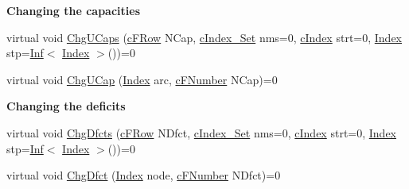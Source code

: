 \begin{Indent}\textbf{ Changing the capacities}\par
\begin{DoxyCompactItemize}
\item 
virtual void \mbox{\hyperlink{class_m_c_f_class_ad548db90d9914f8a40bbb4823f274ccc}{Chg\+U\+Caps}} (\mbox{\hyperlink{class_m_c_f_class_ad325f3193dbba0ddef1da4e72d29eda6}{c\+F\+Row}} N\+Cap, \mbox{\hyperlink{class_m_c_f_class_a81575b2d4e4d5636b17170432150ae69}{c\+Index\+\_\+\+Set}} nms=0, \mbox{\hyperlink{class_m_c_f_class_a76aaabb20535c51a2752b93f6c38fe54}{c\+Index}} strt=0, \mbox{\hyperlink{class_m_c_f_class_ad53d6229d7ec28555a9c9c2fd9abf773}{Index}} stp=\mbox{\hyperlink{class_o_p_ttypes__di__unipi__it_1_1_inf}{Inf}}$<$ \mbox{\hyperlink{class_m_c_f_class_ad53d6229d7ec28555a9c9c2fd9abf773}{Index}} $>$())=0
\item 
virtual void \mbox{\hyperlink{class_m_c_f_class_a832883594b6ea5a00fabc9f4be41d9e5}{Chg\+U\+Cap}} (\mbox{\hyperlink{class_m_c_f_class_ad53d6229d7ec28555a9c9c2fd9abf773}{Index}} arc, \mbox{\hyperlink{class_m_c_f_class_a11f747fbdff346237c8db4469d569994}{c\+F\+Number}} N\+Cap)=0
\end{DoxyCompactItemize}
\end{Indent}
\begin{Indent}\textbf{ Changing the deficits}\par
\begin{DoxyCompactItemize}
\item 
virtual void \mbox{\hyperlink{class_m_c_f_class_a50ee5aaf0f8b39a1edec078828ade458}{Chg\+Dfcts}} (\mbox{\hyperlink{class_m_c_f_class_ad325f3193dbba0ddef1da4e72d29eda6}{c\+F\+Row}} N\+Dfct, \mbox{\hyperlink{class_m_c_f_class_a81575b2d4e4d5636b17170432150ae69}{c\+Index\+\_\+\+Set}} nms=0, \mbox{\hyperlink{class_m_c_f_class_a76aaabb20535c51a2752b93f6c38fe54}{c\+Index}} strt=0, \mbox{\hyperlink{class_m_c_f_class_ad53d6229d7ec28555a9c9c2fd9abf773}{Index}} stp=\mbox{\hyperlink{class_o_p_ttypes__di__unipi__it_1_1_inf}{Inf}}$<$ \mbox{\hyperlink{class_m_c_f_class_ad53d6229d7ec28555a9c9c2fd9abf773}{Index}} $>$())=0
\item 
virtual void \mbox{\hyperlink{class_m_c_f_class_a5ae235c4b587c8cffb777719c9221970}{Chg\+Dfct}} (\mbox{\hyperlink{class_m_c_f_class_ad53d6229d7ec28555a9c9c2fd9abf773}{Index}} node, \mbox{\hyperlink{class_m_c_f_class_a11f747fbdff346237c8db4469d569994}{c\+F\+Number}} N\+Dfct)=0
\end{DoxyCompactItemize}
\end{Indent}
